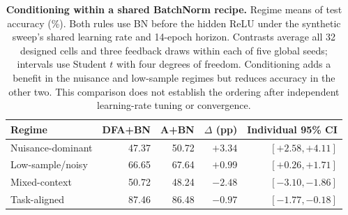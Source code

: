 \begin{table}[!htbp]
\centering\small
\setlength{\tabcolsep}{4pt}
\begin{tabular}{@{}lrrrr@{}}
\toprule
Regime & DFA+BN & A+BN & $\Delta$ (pp) & Individual 95\% CI \\
\midrule
Nuisance-dominant & 47.37 & 50.72 & $+3.34$ & $[+2.58,+4.11]$ \\
Low-sample/noisy & 66.65 & 67.64 & $+0.99$ & $[+0.26,+1.71]$ \\
Mixed-context & 50.72 & 48.24 & $-2.48$ & $[-3.10,-1.86]$ \\
Task-aligned & 87.46 & 86.48 & $-0.97$ & $[-1.77,-0.18]$ \\
\bottomrule
\end{tabular}
\caption{\textbf{Conditioning within a shared BatchNorm recipe.} Regime means of test accuracy (\%). Both rules use BN before the hidden ReLU under the synthetic sweep's shared learning rate and 14-epoch horizon. Contrasts average all 32 designed cells and three feedback draws within each of five global seeds; intervals use Student $t$ with four degrees of freedom. Conditioning adds a benefit in the nuisance and low-sample regimes but reduces accuracy in the other two. This comparison does not establish the ordering after independent learning-rate tuning or convergence.}
\label{tab:infodfa_bn_baseline}
\end{table}
